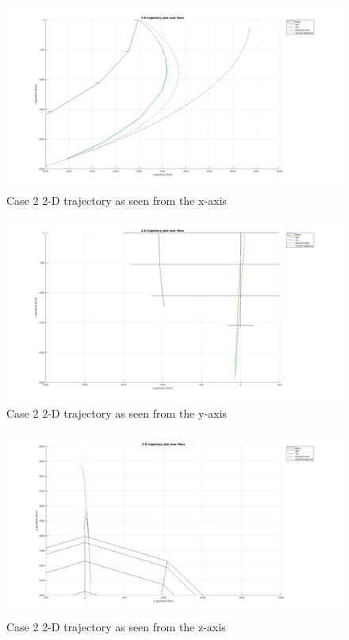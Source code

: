 \begin{figure}[!ht]
\centering
\includegraphics[width=0.8 \textwidth]{figures/verification/case2/PlotFigure1SeenFromXaxisZoom.png}
\caption{Case 2 2-D trajectory as seen from the x-axis}
\label{fig:2PlotFigure1SeenFromXaxisZoom}
\end{figure}

\begin{figure}[!ht]
\centering
\includegraphics[width=0.8 \textwidth]{figures/verification/case2/PlotFigure1SeenFromYaxisZoom.png}
\caption{Case 2 2-D trajectory as seen from the y-axis}
\label{fig:2PlotFigure1SeenFromYaxisZoom}
\end{figure}

\begin{figure}[!ht]
\centering
\includegraphics[width=0.8 \textwidth]{figures/verification/case2/PlotFigure1SeenFromZaxisZoom.png}
\caption{Case 2 2-D trajectory as seen from the z-axis}
\label{fig:2PlotFigure1SeenFromZaxisZoom}
\end{figure}

